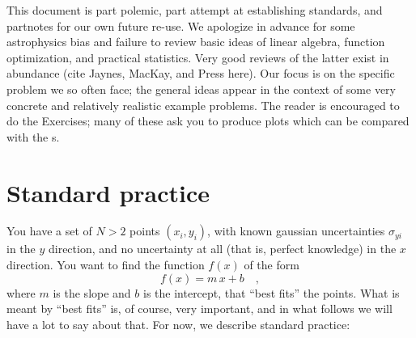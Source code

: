 \documentclass[12pt]{article}
\newcommand{\problemname}{Exercise}
\newcounter{problem}
\begin{document}
This document is part polemic, part attempt at establishing standards,
and partnotes for our own future re-use.  We apologize in advance for
some astrophysics bias and failure to review basic ideas of linear
algebra, function optimization, and practical statistics.  Very good
reviews of the latter exist in abundance (cite Jaynes, MacKay, and
Press here).  Our focus is on the specific problem we so often face;
the general ideas appear in the context of some very concrete and
relatively realistic example problems.  The reader is encouraged to do
the \problemname s; many of these ask you to produce plots which can
be compared with the \figurename s.

\section{Standard practice}\label{sec:standard}

You have a set of $N>2$ points $(x_i,y_i)$, with known gaussian
uncertainties $\sigma_{yi}$ in the $y$ direction, and no uncertainty
at all (that is, perfect knowledge) in the $x$ direction.  You want to
find the function $f(x)$ of the form
\begin{equation}\label{eq:fofx}
f(x) = m\,x + b \quad ,
\end{equation}
where $m$ is the slope and $b$ is the intercept, that ``best fits''
the points.  What is meant by ``best fits'' is, of course, very
important, and in what follows we will have a lot to say about that.
For now, we describe standard practice:
\end{document}
